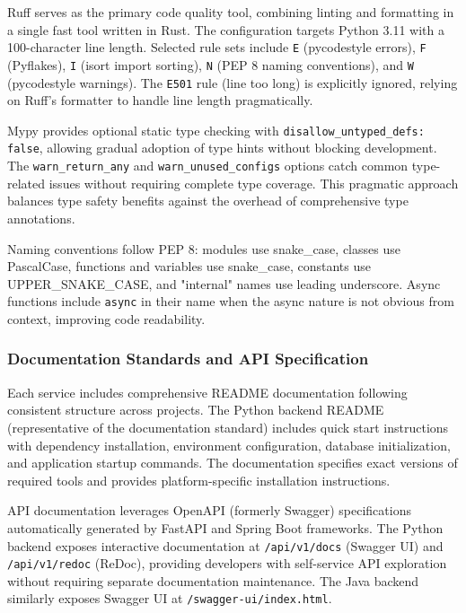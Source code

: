 \documentclass[12pt,a4paper]{article}
\begin{document}
Ruff serves as the primary code quality tool, combining linting and formatting in a single fast tool written in Rust. The configuration targets Python 3.11 with a 100-character line length. Selected rule sets include \texttt{E} (pycodestyle errors), \texttt{F} (Pyflakes), \texttt{I} (isort import sorting), \texttt{N} (PEP 8 naming conventions), and \texttt{W} (pycodestyle warnings). The \texttt{E501} rule (line too long) is explicitly ignored, relying on Ruff's formatter to handle line length pragmatically.\newline

Mypy provides optional static type checking with \texttt{disallow\_untyped\_defs: false}, allowing gradual adoption of type hints without blocking development. The \texttt{warn\_return\_any} and \texttt{warn\_unused\_configs} options catch common type-related issues without requiring complete type coverage. This pragmatic approach balances type safety benefits against the overhead of comprehensive type annotations.\newline

Naming conventions follow PEP 8: modules use snake\_case, classes use PascalCase, functions and variables use snake\_case, constants use UPPER\_SNAKE\_CASE, and "internal" names use leading underscore. Async functions include \texttt{async} in their name when the async nature is not obvious from context, improving code readability.\newline

\subsubsection{Documentation Standards and API Specification}

Each service includes comprehensive README documentation following consistent structure across projects. The Python backend README (representative of the documentation standard) includes quick start instructions with dependency installation, environment configuration, database initialization, and application startup commands. The documentation specifies exact versions of required tools and provides platform-specific installation instructions.\newline

API documentation leverages OpenAPI (formerly Swagger) specifications automatically generated by FastAPI and Spring Boot frameworks. The Python backend exposes interactive documentation at \texttt{/api/v1/docs} (Swagger UI) and \texttt{/api/v1/redoc} (ReDoc), providing developers with self-service API exploration without requiring separate documentation maintenance. The Java backend similarly exposes Swagger UI at \texttt{/swagger-ui/index.html}.\newline
\end{document}
